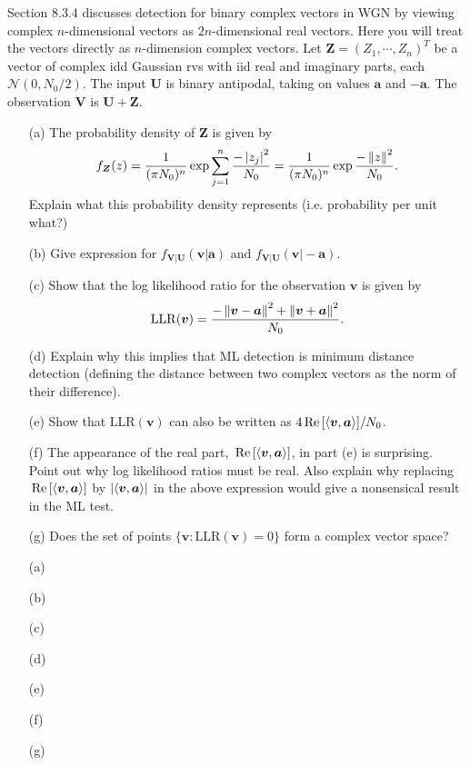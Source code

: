\documentclass{assignment}
\begin{document}
\begin{prob}[8.11]
    Section 8.3.4 discusses detection for binary complex vectors in WGN by viewing complex $n$-dimensional vectors as $2n$-dimensional real vectors. Here you will treat the vectors directly as $n$-dimension complex vectors. Let $\bm{Z}=(Z_1,\cdots,Z_n)^T$ be a vector of complex idd Gaussian rvs with iid real and imaginary parts, each $\mathcal{N}(0,N_0/2)$. The input $\bm{U}$ is binary antipodal, taking on values $\bm{a}$ and $-\bm{a}$. The observation $\bm{V}$ is $\bm{U}+\bm{Z}$.
    \begin{itemize}
        \item[(a)] The probability density of $\bm{Z}$ is given by
        \[
            f_{\bm{Z}}(z)=\frac{1}{(\pi N_0)^n}\exp\sum_{j=1}^n\frac{-\left\lvert z_j\right\rvert^2}{N_0}=\frac{1}{(\pi N_0)^n}\exp\frac{-\left\lVert z\right\rVert^2}{N_0}.
        \]
        Explain what this probability density represents (i.e. probability per unit what?)
        \item[(b)] Give expression for $f_{\bm{V}\vert\bm{U}}(\bm{v}\vert\bm{a})$ and $f_{\bm{V}\vert\bm{U}}(\bm{v}\vert-\bm{a})$.
        \item[(c)] Show that the log likelihood ratio for the observation $\bm{v}$ is given by
        \[
            \mathrm{LLR}(\bm{v})=\frac{-\left\lVert\bm{v}-\bm{a}\right\rVert^2+\left\lVert\bm{v}+\bm{a}\right\rVert^2}{N_0}.
        \]
        \item[(d)] Explain why this implies that ML detection is minimum distance detection (defining the distance between two complex vectors as the norm of their difference).
        \item[(e)] Show that $\mathrm{LLR}(\bm{v})$ can also be written as $4\,\text{Re}\,[\langle\bm{v},\bm{a}\rangle]/N_0$.
        \item[(f)] The appearance of the real part, $\,\text{Re}\,[\langle\bm{v},\bm{a}\rangle]$, in part (e) is surprising. Point out why log likelihood ratios must be real. Also explain why replacing $\,\text{Re}\,[\langle\bm{v},\bm{a}\rangle]$ by $\left\lvert\langle\bm{v},\bm{a}\rangle\right\rvert$ in the above expression would give a nonsensical result in the ML test.
        \item[(g)] Does the set of points $\{\bm{v}:\text{LLR}(\bm{v})=0\}$ form a complex vector space?
    \end{itemize}
\end{prob}
\begin{sol}
    \begin{itemize}
        \item[(a)] 
        \item[(b)] 
        \item[(c)] 
        \item[(d)] 
        \item[(e)] 
        \item[(f)] 
        \item[(g)] 
    \end{itemize}
\end{sol}
\end{document}

